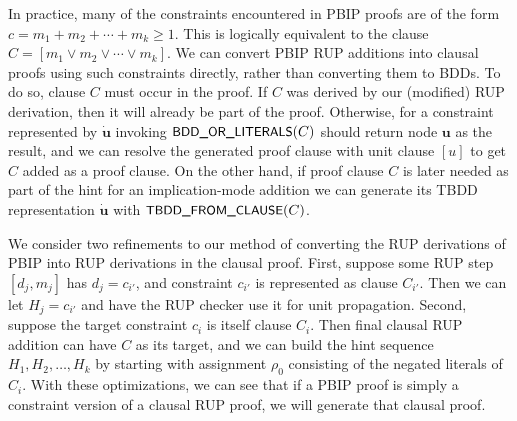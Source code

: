 \documentclass{easychair}
\newcommand{\mlit}{m}
\newcommand{\trust}[1]{\dot {#1}}
\newcommand{\assign}{\rho}
\newcommand{\fname}[1]{\mbox{\small\sf #1}}
\newcommand{\node}[1]{\mathbf{#1}}
\newcommand{\nodeu}{\node{u}}
\begin{document}
In practice, many of the constraints encountered in PBIP proofs are of
the form $c = \mlit_1 + \mlit_2 + \cdots + \mlit_k \geq 1$.  This is logically
equivalent to the clause $C = [\mlit_1 \lor \mlit_2 \lor \cdots \lor  \mlit_k]$.
We can convert PBIP RUP additions into clausal proofs
using such constraints directly, rather than converting
them to BDDs.
To do so, clause $C$ must occur in the proof.  If $C$ was derived by our (modified) RUP
derivation, then it will already be part of the proof.  Otherwise, for a constraint represented by $\trust{\nodeu}$
invoking 
$\fname{BDD\_OR\_LITERALS}(C)$ should return node $\nodeu$ as the result, and we can resolve the generated proof clause with unit clause $[u]$
to get $C$ added as a proof clause.
On the other hand, if proof clause $C$ is later needed as part of the hint for an implication-mode addition
we can generate its TBDD representation $\trust{\nodeu}$ with
$\fname{TBDD\_FROM\_CLAUSE}(C)$.

We consider two refinements to our method of converting the RUP
derivations of PBIP into RUP derivations in the clausal proof.  First,
suppose some RUP step $[d_j, \mlit_j]$ has $d_j = c_{i'}$, and constraint $c_{i'}$ is
represented as clause $C_{i'}$.  Then we can let $H_j = c_{i'}$
and have the RUP checker use it for
unit propagation.  Second, suppose the target constraint $c_i$ is
itself clause $C_i$.  Then final clausal RUP addition can have $C$ as its target,
and we can build the hint sequence $H_1, H_2, \ldots, H_k$
by starting with
assignment $\assign_0$ consisting of the negated literals of $C_i$.
With these optimizations, we can see that if a PBIP proof is simply a constraint
version of a clausal RUP proof, we will generate that clausal proof.


\end{document}
